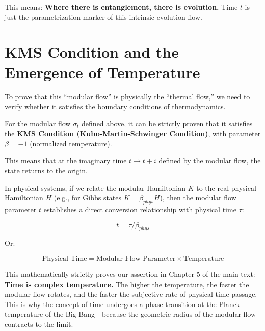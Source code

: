 This means: \textbf{Where there is entanglement, there is evolution.} Time $t$ is just the parametrization marker of this intrinsic evolution flow.

\section{KMS Condition and the Emergence of Temperature}

To prove that this ``modular flow'' is physically the ``thermal flow,'' we need to verify whether it satisfies the boundary conditions of thermodynamics.

For the modular flow $\sigma_t$ defined above, it can be strictly proven that it satisfies the \textbf{KMS Condition (Kubo-Martin-Schwinger Condition)}, with parameter $\beta = -1$ (normalized temperature).

This means that at the imaginary time $t \to t + i$ defined by the modular flow, the state returns to the origin.

In physical systems, if we relate the modular Hamiltonian $K$ to the real physical Hamiltonian $H$ (e.g., for Gibbs states $K = \beta_{phys} H$), then the modular flow parameter $t$ establishes a direct conversion relationship with physical time $\tau$:

$$t = \tau / \beta_{phys}$$

Or:

$$\text{Physical Time} = \text{Modular Flow Parameter} \times \text{Temperature}$$

This mathematically strictly proves our assertion in Chapter 5 of the main text: \textbf{Time is complex temperature.} The higher the temperature, the faster the modular flow rotates, and the faster the subjective rate of physical time passage. This is why the concept of time undergoes a phase transition at the Planck temperature of the Big Bang---because the geometric radius of the modular flow contracts to the limit.

